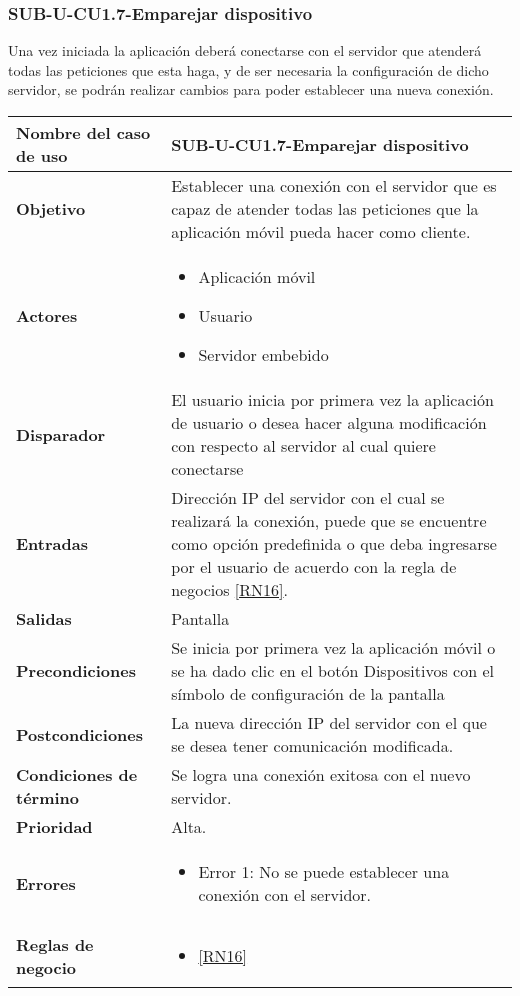 \subsubsection{SUB-U-CU1.7-Emparejar dispositivo}\label{SUB-U-CU1.7}
Una vez iniciada la aplicación deberá conectarse con el servidor que atenderá todas las peticiones que esta haga, y de ser necesaria la configuración de dicho servidor, se podrán realizar cambios para poder establecer una nueva conexión.


\begin{longtable}{|J{5cm}|J{10.3cm}|}
	\hline
	\textbf{Nombre del caso de uso} &
		SUB-U-CU1.7-Emparejar dispositivo \\ \hline
	\textbf{Objetivo} &
		Establecer una conexión con el servidor que es capaz de atender todas las peticiones que la aplicación móvil pueda hacer como cliente. \\ \hline
	\textbf{Actores} &
	    \begin{itemize}
			\item Aplicación móvil
			\item Usuario
		    \item Servidor embebido
		\end{itemize}\\ \hline 
	\textbf{Disparador} & 
		El usuario inicia por primera vez la aplicación de usuario o desea hacer alguna modificación con respecto al servidor al cual quiere conectarse \\ \hline 
	\textbf{Entradas} & 
		Dirección IP del servidor con el cual se realizará la conexión, puede que se encuentre como opción predefinida o que deba ingresarse por el usuario de acuerdo con la regla de negocios \ref{RN16}.\\ \hline 
	\textbf{Salidas} & 
		Pantalla \\ \hline  %
	\textbf{Precondiciones} &
		Se inicia por primera vez la aplicación móvil o se ha dado clic en el botón Dispositivos con el símbolo de configuración de la pantalla \\ \hline %
	\textbf{Postcondiciones} &
		La nueva dirección IP del servidor con el que se desea tener comunicación modificada.\\ \hline 
	\textbf{Condiciones de término} & 
		Se logra una conexión exitosa con el nuevo servidor. \\ \hline
	\textbf{Prioridad} & 
		Alta. \\ \hline
	\textbf{Errores} & 
		\begin{itemize}
			\item \label{SUB-M-CU1:Error1} Error 1: No se puede establecer una conexión con el servidor.
		\end{itemize} \\ \hline
	\textbf{Reglas de negocio} & 
	    \begin{itemize}
		    \item \ref{RN16}
		\end{itemize} \\ \hline


\end{longtable}
